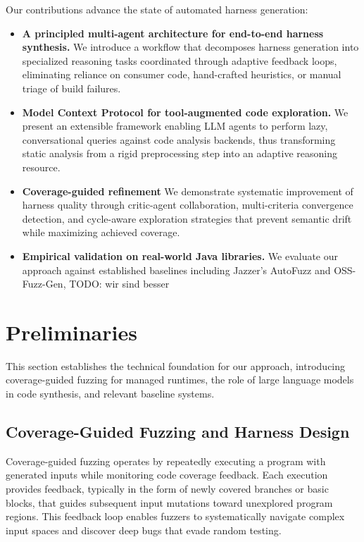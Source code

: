 \documentclass[sigconf,review,anonymous]{acmart}
\begin{document}
Our contributions advance the state of automated harness generation:
\begin{itemize}
    \item \textbf{A principled multi-agent architecture for end-to-end harness synthesis.} We introduce a workflow that decomposes harness generation into specialized reasoning tasks coordinated through adaptive feedback loops, eliminating reliance on consumer code, hand-crafted heuristics, or manual triage of build failures.

    \item \textbf{Model Context Protocol for tool-augmented code exploration.} We present an extensible framework enabling LLM agents to perform lazy, conversational queries against code analysis backends, thus transforming static analysis from a rigid preprocessing step into an adaptive reasoning resource.

    \item \textbf{Coverage-guided refinement} We demonstrate systematic improvement of harness quality through critic-agent collaboration, multi-criteria convergence detection, and cycle-aware exploration strategies that prevent semantic drift while maximizing achieved coverage.

    \item \textbf{Empirical validation on real-world Java libraries.} We evaluate our approach against established baselines including Jazzer's AutoFuzz and OSS-Fuzz-Gen, TODO: wir sind besser
\end{itemize}


\section{Preliminaries}

This section establishes the technical foundation for our approach, introducing coverage-guided fuzzing for managed runtimes, the role of large language models in code synthesis, and relevant baseline systems.

\subsection{Coverage-Guided Fuzzing and Harness Design}
\label{sec:prelim:fuzzing}

Coverage-guided fuzzing operates by repeatedly executing a program with generated inputs while monitoring code coverage feedback. Each execution provides feedback, typically in the form of newly covered branches or basic blocks, that guides subsequent input mutations toward unexplored program regions. This feedback loop enables fuzzers to systematically navigate complex input spaces and discover deep bugs that evade random testing.
\end{document}
